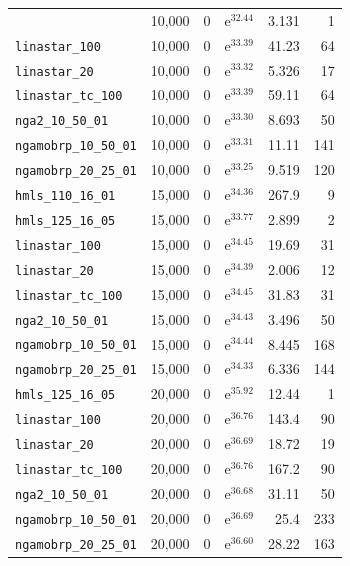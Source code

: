 \begin{longtable}{|l|r|r|r|r|r|}
{    \texttt{hmls\_125\_16\_05} & 10,000 & 0 & $\mathrm{e}^{32.44}$ & 3.131 & 1 \\
    \texttt{linastar\_100} & 10,000 & 0 & $\mathrm{e}^{33.39}$ & 41.23 & 64 \\
    \texttt{linastar\_20} & 10,000 & 0 & $\mathrm{e}^{33.32}$ & 5.326 & 17 \\
    \texttt{linastar\_tc\_100} & 10,000 & 0 & $\mathrm{e}^{33.39}$ & 59.11 & 64 \\
    \texttt{nga2\_10\_50\_01} & 10,000 & 0 & $\mathrm{e}^{33.30}$ & 8.693 & 50 \\
    \texttt{ngamobrp\_10\_50\_01} & 10,000 & 0 & $\mathrm{e}^{33.31}$ & 11.11 & 141 \\
    \texttt{ngamobrp\_20\_25\_01} & 10,000 & 0 & $\mathrm{e}^{33.25}$ & 9.519 & 120 \\
    \texttt{hmls\_110\_16\_01} & 15,000 & 0 & $\mathrm{e}^{34.36}$ & 267.9 & 9 \\
    \texttt{hmls\_125\_16\_05} & 15,000 & 0 & $\mathrm{e}^{33.77}$ & 2.899 & 2 \\
    \texttt{linastar\_100} & 15,000 & 0 & $\mathrm{e}^{34.45}$ & 19.69 & 31 \\
    \texttt{linastar\_20} & 15,000 & 0 & $\mathrm{e}^{34.39}$ & 2.006 & 12 \\
    \texttt{linastar\_tc\_100} & 15,000 & 0 & $\mathrm{e}^{34.45}$ & 31.83 & 31 \\
    \texttt{nga2\_10\_50\_01} & 15,000 & 0 & $\mathrm{e}^{34.43}$ & 3.496 & 50 \\
    \texttt{ngamobrp\_10\_50\_01} & 15,000 & 0 & $\mathrm{e}^{34.44}$ & 8.445 & 168 \\
    \texttt{ngamobrp\_20\_25\_01} & 15,000 & 0 & $\mathrm{e}^{34.33}$ & 6.336 & 144 \\
    \texttt{hmls\_125\_16\_05} & 20,000 & 0 & $\mathrm{e}^{35.92}$ & 12.44 & 1 \\
    \texttt{linastar\_100} & 20,000 & 0 & $\mathrm{e}^{36.76}$ & 143.4 & 90 \\
    \texttt{linastar\_20} & 20,000 & 0 & $\mathrm{e}^{36.69}$ & 18.72 & 19 \\
    \texttt{linastar\_tc\_100} & 20,000 & 0 & $\mathrm{e}^{36.76}$ & 167.2 & 90 \\
    \texttt{nga2\_10\_50\_01} & 20,000 & 0 & $\mathrm{e}^{36.68}$ & 31.11 & 50 \\
    \texttt{ngamobrp\_10\_50\_01} & 20,000 & 0 & $\mathrm{e}^{36.69}$ & 25.4 & 233 \\
    \texttt{ngamobrp\_20\_25\_01} & 20,000 & 0 & $\mathrm{e}^{36.60}$ & 28.22 & 163 \\
\end{longtable}
